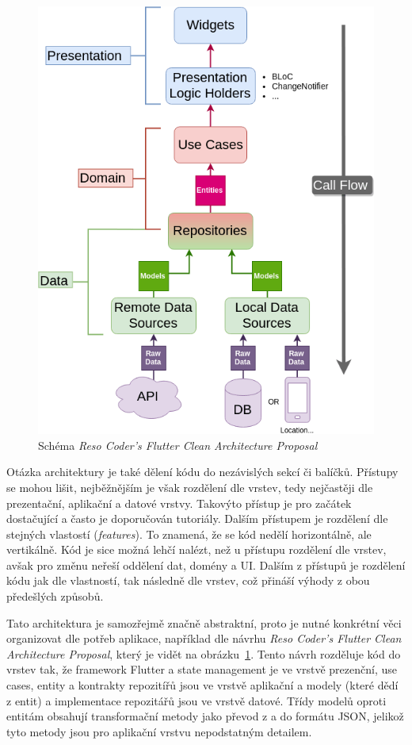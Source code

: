 \begin{figure}[t!]
    \centering
    \includegraphics[width=0.7\linewidth]{assets/technology-research/architecture/reso-coder-clean-architecture.png}
    \caption{Schéma \emph{Reso Coder's Flutter Clean Architecture Proposal}~\cite{the_clean_architecture}}
    \label{fig:reso_coder_clean_architecture}
\end{figure}

Otázka architektury je také dělení kódu do nezávislých sekcí či balíčků.
Přístupy se mohou lišit,
nejběžnějším je však rozdělení dle vrstev,
tedy nejčastěji dle prezentační, aplikační a datové vrstvy.
Takovýto přístup je pro začátek dostačující a často je doporučován tutoriály.
Dalším přístupem je rozdělení dle stejných vlastostí (\emph{features}).
To znamená,
že se kód nedělí horizontálně,
ale vertikálně.
Kód je sice možná lehčí nalézt,
než u přístupu rozdělení dle vrstev,
avšak pro změnu neřeší oddělení dat, domény a UI.
Dalším z přístupů je rozdělení kódu jak dle vlastností,
tak následně dle vrstev,
což přináší výhody z obou předešlých
způsobů.~\cite[kapitola 34]{the_clean_architecture}

Tato architektura je samozřejmě značně abstraktní,
proto je nutné konkrétní věci organizovat dle potřeb aplikace,
například dle návrhu \emph{Reso Coder's Flutter Clean Architecture Proposal},
který je vidět na obrázku~\ref{fig:reso_coder_clean_architecture}.
Tento návrh rozděluje kód do vrstev tak,
že framework Flutter a state management je ve vrstvě prezenční,
use cases, entity a kontrakty repozitířů jsou ve vrstvě aplikační
a modely (které dědí z entit) a implementace repozitářů jsou ve vrstvě datové.
Třídy modelů oproti entitám obsahují transformační metody jako
převod z a do formátu JSON,
jelikož tyto metody jsou pro aplikační vrstvu nepodstatným
detailem.~\cite{reso_coder_clean_architecture}

